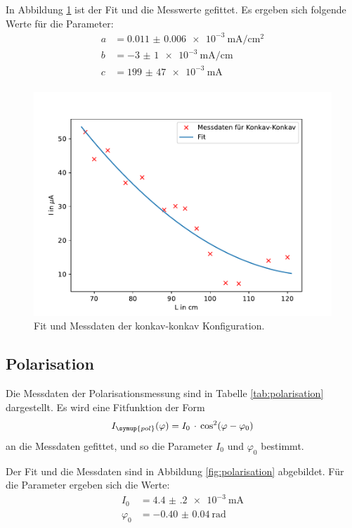 In Abbildung \ref{fig:konkavkonkav} ist der Fit und die Messwerte gefittet.
Es ergeben sich folgende Werte für die Parameter:
\begin{align}
  a &= \SI{0.011(6)e-3}{\milli\ampere\per\centi\meter\squared}\\
  b &= \SI{-3(1)e-3}{\milli\ampere\per\centi\meter}\\
  c &= \SI{199(47)e-3}{\milli\ampere}\\
\end{align}
\begin{figure}[H]
  \centering
  \includegraphics{stabilitaet_konkavkonkav.pdf}
  \caption{Fit und Messdaten der konkav-konkav Konfiguration.}
  \label{fig:konkavkonkav}
\end{figure}

\subsection{Polarisation}

Die Messdaten der Polarisationsmessung sind in Tabelle \ref{tab:polarisation} dargestellt.
Es wird eine Fitfunktion der Form
\begin{align}
  I_{\symup{pol}}(\varphi) = I_0\,\cdot\,\cos^2(\varphi-\varphi_0)
\end{align}
an die Messdaten gefittet, und so die Parameter $I_0$ und $\varphi_0$ bestimmt.

Der Fit und die Messdaten sind in Abbildung \ref{fig:polarisation} abgebildet. Für
die Parameter ergeben sich die Werte:
\begin{align}
  I_0 &= \SI{4.4(2)e-3}{\milli\ampere}\\
  \varphi_0 &= \SI{-0.40(4)}{\radian}\\
\end{align}

